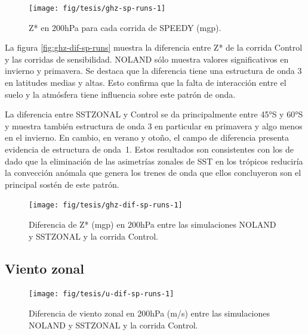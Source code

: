 \documentclass[spanish,a4paper,12pt,oneside]{book}
\begin{document}
\begin{landscape}\begin{figure}

{\centering \texttt{[image: fig/tesis/ghz-sp-runs-1]} 

}

\caption{Z* en 200hPa para cada corrida de SPEEDY (mgp).}\label{fig:ghz-sp-runs}
\end{figure}
\end{landscape}

La figura \autoref{fig:ghz-dif-sp-runs} muestra la diferencia entre Z*
de la corrida Control y las corridas de sensibilidad. NOLAND sólo
muestra valores significativos en invierno y primavera. Se destaca que
la diferencia tiene una estructura de onda 3 en latitudes medias y
altas. Esto confirma que la falta de interacción entre el suelo y la
atmósfera tiene influencia sobre este patrón de onda.

La diferencia entre SSTZONAL y Control se da principalmente entre 45°S y
60°S y muestra también estructura de onda 3 en particular en primavera y
algo menos en el invierno. En cambio, en verano y otoño, el campo de
diferencia presenta evidencia de estructura de onda~1. Estos resultados
son consistentes con los de \textcite{Quintanar1995} dado que la
eliminación de las asimetrías zonales de SST en los trópicos reduciría
la convección anómala que genera los trenes de onda que ellos
concluyeron son el principal sostén de este patrón.

\begin{landscape}\begin{figure}

{\centering \texttt{[image: fig/tesis/ghz-dif-sp-runs-1]} 

}

\caption{Diferencia de Z* (mgp) en 200hPa entre las simulaciones NOLAND y SSTZONAL y la corrida Control.}\label{fig:ghz-dif-sp-runs}
\end{figure}
\end{landscape}

\subsection{Viento zonal}\label{viento-zonal-2}

\begin{landscape}\begin{figure}

{\centering \texttt{[image: fig/tesis/u-dif-sp-runs-1]} 

}

\caption{Diferencia de viento zonal en 200hPa (m/s) entre las simulaciones NOLAND y SSTZONAL y la corrida Control.}\label{fig:u-dif-sp-runs}
\end{figure}
\end{landscape}
\end{document}
